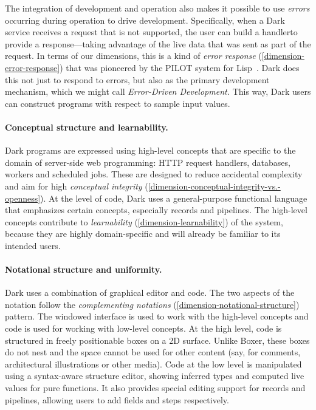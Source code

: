 \documentclass[english,submission]{programming}
\providecommand{\DIFadd}[1]{{\protect\color{blue}\uwave{#1}}} %
\providecommand{\DIFaddbegin}{} %
\providecommand{\DIFaddend}{} %
\begin{document}
The integration of development and operation also makes it possible to
use \emph{errors} occurring during operation to drive development.
Specifically, when a Dark service receives a request that is not
supported, the user can build a handler\DIFaddbegin \DIFadd{~\mbox{%
\cite{DarkErrors} }\hspace{0pt}%
}\DIFaddend to provide a
response---taking advantage of the live data that was sent as part of
the request. In terms of our dimensions, this is a kind of \emph{error
response} (\ref{dimension-error-response}) that was pioneered by the
PILOT system for Lisp~\cite{Pilot}. Dark does this not just to respond
to errors, but also as the primary development mechanism, which we might
call \emph{Error-Driven Development.} This way, Dark users can construct
programs with respect to sample input values.

\paragraph{Conceptual structure and learnability.}

Dark programs are expressed using high-level concepts that are specific
to the domain of server-side web programming: HTTP request handlers,
databases, workers and scheduled jobs. These are designed to reduce
accidental complexity and aim for high \emph{conceptual integrity}
(\ref{dimension-conceptual-integrity-vs.-openness}). At the level of
code, Dark uses a general-purpose functional language that emphasizes
certain concepts, especially records and pipelines. The high-level
concepts contribute to \emph{learnability}
(\ref{dimension-learnability}) of the system, because they are highly
domain-specific and will already be familiar to its intended users.

\paragraph{Notational structure and uniformity.}

Dark uses a combination of graphical editor and code. The two aspects of
the notation follow the \emph{complementing notations}
(\ref{dimension-notational-structure}) pattern. The windowed interface
is used to work with the high-level concepts and code is used for
working with low-level concepts. At the high level, code is structured
in freely positionable boxes on a 2D surface. Unlike Boxer\DIFaddbegin \DIFadd{~}\DIFaddend \cite{Boxer},
these boxes do not nest and the space cannot be used for other content
(say, for comments, architectural illustrations or other media). Code at
the low level is manipulated using a syntax-aware structure editor,
showing inferred types and computed live values for pure functions. It
also provides special editing support for records and pipelines,
allowing users to add fields and steps respectively.
\end{document}
